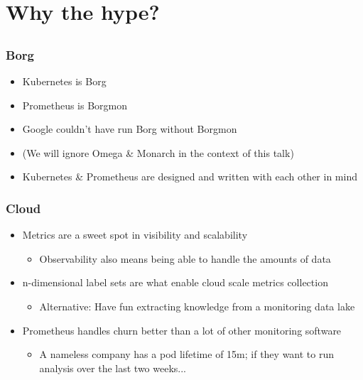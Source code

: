 \documentclass[aspectratio=169]{beamer}
\begin{document}
\section{Why the hype?}


\subsection{}

\begin{frame}
	\frametitle{Borg}
	\vfill
	\begin{itemize}
		\item Kubernetes is Borg
		\item Prometheus is Borgmon
		\item Google couldn't have run Borg without Borgmon
		\item (We will ignore Omega \& Monarch in the context of this talk)
		\item Kubernetes \& Prometheus are designed and written with each other in mind
	\end{itemize}
	\vfill
\end{frame}

\begin{frame}
	\frametitle{Cloud}
	\vfill
	\begin{itemize}
		\item Metrics are a sweet spot in visibility and scalability
		\begin{itemize}
			\item Observability also means being able to handle the amounts of data
		\end{itemize}
		\item n-dimensional label sets are what enable cloud scale metrics collection
		\begin{itemize}
			\item Alternative: Have fun extracting knowledge from a monitoring data lake
		\end{itemize}
		\item Prometheus handles churn better than a lot of other monitoring software
		\begin{itemize}
			\item A nameless company has a pod lifetime of 15m; if they want to run analysis over the last two weeks...
		\end{itemize}
	\end{itemize}
	\vfill
\end{frame}
\end{document}
